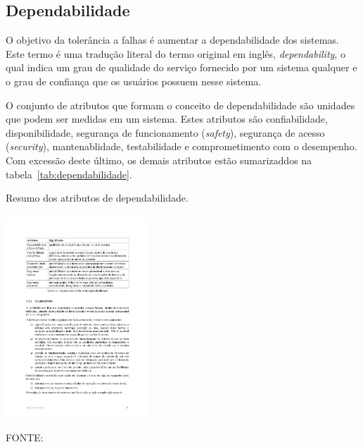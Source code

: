 \subsection{Dependabilidade} %
\label{sub:dependabilidade}

O objetivo da tolerância a falhas é aumentar a dependabilidade dos sistemas. Este termo é uma tradução literal do termo original em inglês, \emph{dependability}, o qual indica um grau de qualidade do serviço fornecido por um sistema qualquer e o grau de confiança que os usuários possuem nesse sistema.

O conjunto de atributos que formam o conceito de dependabilidade são unidades que podem ser medidas em um sistema. Estes atributos são confiabilidade, disponibilidade, segurança de funcionamento (\emph{safety}), segurança de acesso (\emph{security}), mantenablidade, testabilidade e comprometimento com o desempenho. Com excessão deste último, os demais atributos estão sumarizaddos na tabela~\ref{tab:dependabilidade}.

\begin{table}
\begin{center}
\caption{Resumo dos atributos de dependabilidade.}\label{tab:dependabilidade}

	\includegraphics[height=3in]{figuras/tabela_weber.pdf}

\end{center}

FONTE:~\cite{weber2002roteiro}
\end{table}
